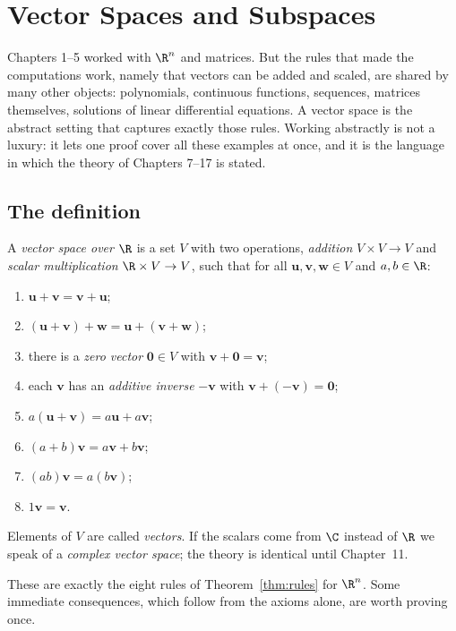 \chapter{Vector Spaces and Subspaces}

Chapters 1--5 worked with $\R^n$ and matrices. But the rules that made the computations work, namely that vectors can be added and scaled, are shared by many other objects: polynomials, continuous functions, sequences, matrices themselves, solutions of linear differential equations. A vector space is the abstract setting that captures exactly those rules. Working abstractly is not a luxury: it lets one proof cover all these examples at once, and it is the language in which the theory of Chapters 7--17 is stated.

\section{The definition}

\begin{definition}
A \emph{vector space over $\R$} is a set $V$ with two operations, \emph{addition} $V\times V\to V$ and \emph{scalar multiplication} $\R\times V\to V$, such that for all $\mathbf{u},\mathbf{v},\mathbf{w}\in V$ and $a,b\in\R$:
\begin{enumerate}[label=(V\arabic*)]
  \item $\mathbf{u}+\mathbf{v}=\mathbf{v}+\mathbf{u}$;
  \item $(\mathbf{u}+\mathbf{v})+\mathbf{w}=\mathbf{u}+(\mathbf{v}+\mathbf{w})$;
  \item there is a \emph{zero vector} $\mathbf{0}\in V$ with $\mathbf{v}+\mathbf{0}=\mathbf{v}$;
  \item each $\mathbf{v}$ has an \emph{additive inverse} $-\mathbf{v}$ with $\mathbf{v}+(-\mathbf{v})=\mathbf{0}$;
  \item $a(\mathbf{u}+\mathbf{v})=a\mathbf{u}+a\mathbf{v}$;
  \item $(a+b)\mathbf{v}=a\mathbf{v}+b\mathbf{v}$;
  \item $(ab)\mathbf{v}=a(b\mathbf{v})$;
  \item $1\mathbf{v}=\mathbf{v}$.
\end{enumerate}
Elements of $V$ are called \emph{vectors}. If the scalars come from $\C$ instead of $\R$ we speak of a \emph{complex vector space}; the theory is identical until Chapter~11.
\end{definition}

These are exactly the eight rules of Theorem~\ref{thm:rules} for $\R^n$. Some immediate consequences, which follow from the axioms alone, are worth proving once.

